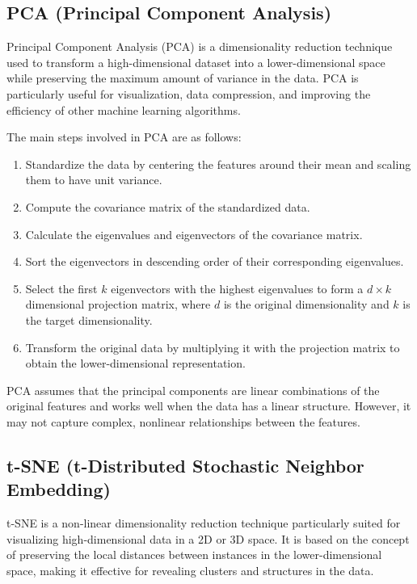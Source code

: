 \documentclass[12pt]{article}
\begin{document}
\subsection{PCA (Principal Component Analysis)}
Principal Component Analysis (PCA) is a dimensionality reduction technique used to transform a high-dimensional dataset into a lower-dimensional space while preserving the maximum amount of variance in the data. PCA is particularly useful for visualization, data compression, and improving the efficiency of other machine learning algorithms.

The main steps involved in PCA are as follows:

\begin{enumerate}
\item Standardize the data by centering the features around their mean and scaling them to have unit variance.
\item Compute the covariance matrix of the standardized data.
\item Calculate the eigenvalues and eigenvectors of the covariance matrix.
\item Sort the eigenvectors in descending order of their corresponding eigenvalues.
\item Select the first $k$ eigenvectors with the highest eigenvalues to form a $d \times k$ dimensional projection matrix, where $d$ is the original dimensionality and $k$ is the target dimensionality.
\item Transform the original data by multiplying it with the projection matrix to obtain the lower-dimensional representation.
\end{enumerate}
PCA assumes that the principal components are linear combinations of the original features and works well when the data has a linear structure. However, it may not capture complex, nonlinear relationships between the features.

\subsection{t-SNE (t-Distributed Stochastic Neighbor Embedding)}
t-SNE is a non-linear dimensionality reduction technique particularly suited for visualizing high-dimensional data in a 2D or 3D space. It is based on the concept of preserving the local distances between instances in the lower-dimensional space, making it effective for revealing clusters and structures in the data.
\end{document}
